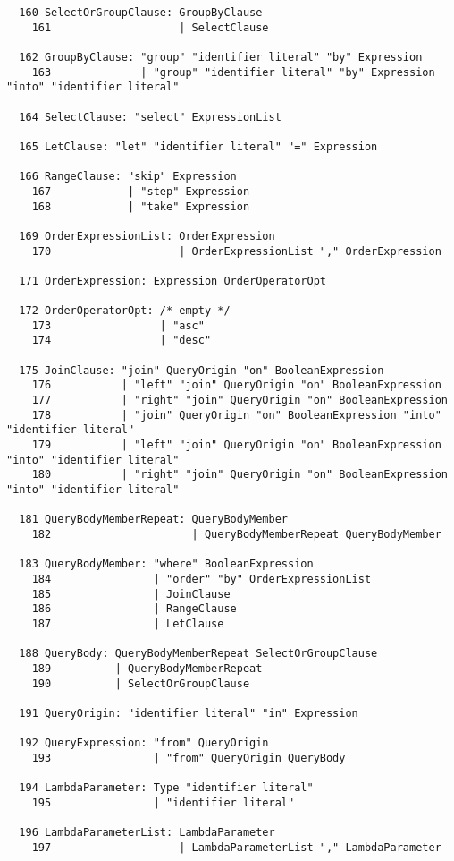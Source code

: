 \begin{espacosimples}
\begin{scriptsize}
\begin{lstlisting}
  160 SelectOrGroupClause: GroupByClause
    161                    | SelectClause
  
  162 GroupByClause: "group" "identifier literal" "by" Expression
    163              | "group" "identifier literal" "by" Expression "into" "identifier literal"
  
  164 SelectClause: "select" ExpressionList
  
  165 LetClause: "let" "identifier literal" "=" Expression
  
  166 RangeClause: "skip" Expression
    167            | "step" Expression
    168            | "take" Expression
  
  169 OrderExpressionList: OrderExpression
    170                    | OrderExpressionList "," OrderExpression
  
  171 OrderExpression: Expression OrderOperatorOpt
  
  172 OrderOperatorOpt: /* empty */
    173                 | "asc"
    174                 | "desc"
  
  175 JoinClause: "join" QueryOrigin "on" BooleanExpression
    176           | "left" "join" QueryOrigin "on" BooleanExpression
    177           | "right" "join" QueryOrigin "on" BooleanExpression
    178           | "join" QueryOrigin "on" BooleanExpression "into" "identifier literal"
    179           | "left" "join" QueryOrigin "on" BooleanExpression "into" "identifier literal"
    180           | "right" "join" QueryOrigin "on" BooleanExpression "into" "identifier literal"
  
  181 QueryBodyMemberRepeat: QueryBodyMember
    182                      | QueryBodyMemberRepeat QueryBodyMember
  
  183 QueryBodyMember: "where" BooleanExpression
    184                | "order" "by" OrderExpressionList
    185                | JoinClause
    186                | RangeClause
    187                | LetClause
  
  188 QueryBody: QueryBodyMemberRepeat SelectOrGroupClause
    189          | QueryBodyMemberRepeat
    190          | SelectOrGroupClause
  
  191 QueryOrigin: "identifier literal" "in" Expression
  
  192 QueryExpression: "from" QueryOrigin
    193                | "from" QueryOrigin QueryBody
  
  194 LambdaParameter: Type "identifier literal"
    195                | "identifier literal"
  
  196 LambdaParameterList: LambdaParameter
    197                    | LambdaParameterList "," LambdaParameter
  

\end{lstlisting}
\end{scriptsize}
\end{espacosimples}

